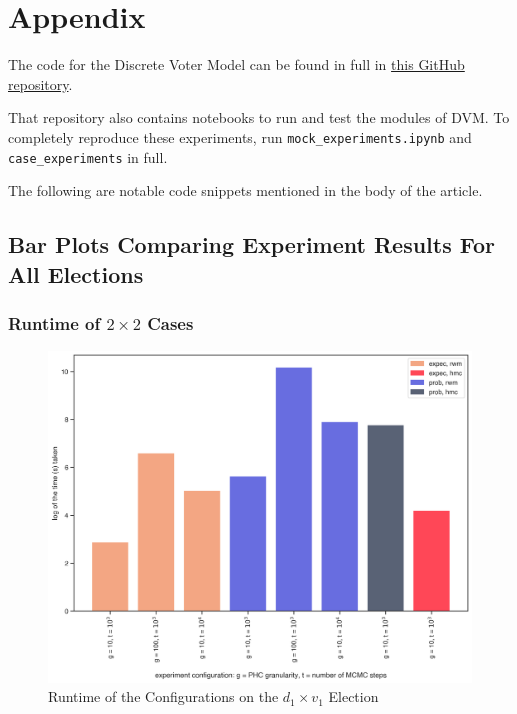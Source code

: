 \chapter{Appendix}
\label{chap:appendix}

The code for the Discrete Voter Model can be found in full in \href{https://github.com/hangulu/thesis}{this GitHub repository}.

That repository also contains notebooks to run and test the modules of DVM. To completely reproduce these experiments, run \texttt{mock\_experiments.ipynb} and \texttt{case\_experiments} in full.

The following are notable code snippets mentioned in the body of the article.

\newpage
{}

\newpage
{}

\newpage
\section{Bar Plots Comparing Experiment Results For All Elections}
\label{sec:appendix_bars}

\FloatBarrier
\subsection{Runtime of $2 \times 2$ Cases}

\begin{figure}[ht]\centering
 \includegraphics[width=0.75\linewidth]{figures/1_1_time.png}
 \caption{Runtime of the Configurations on the $d_1 \times v_1$ Election}
 \label{fig:1_1_time_append}
\end{figure}

